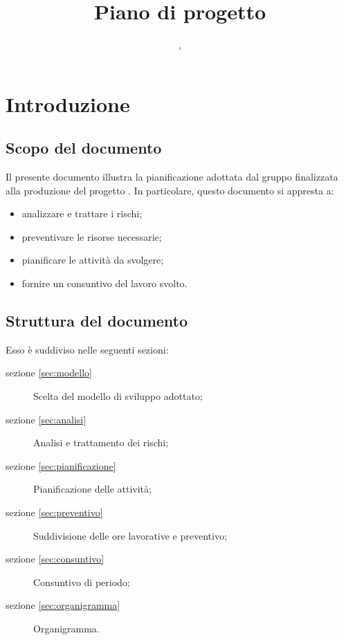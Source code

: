 

\author{\LB, \PB}
\supervisor{\GG, \MM}
\dest{\TV, \ZU}
\title{Piano di progetto}


\maketitle

\tableofcontents
\newpage

\section{Introduzione}
	\subsection{Scopo del documento}

	Il presente documento illustra la pianificazione adottata dal gruppo \hx{} finalizzata alla produzione del progetto \proj{}.
	In particolare, questo documento si appresta a:
	\begin{itemize}
		\item analizzare e trattare i rischi;
		\item preventivare le risorse necessarie;
		\item pianificare le attività da svolgere;
		\item fornire un consuntivo del lavoro svolto.
	\end{itemize}
	\subsection{Struttura del documento}
	Esso è suddiviso nelle seguenti sezioni:
\begin{description}
	\item[sezione \ref{sec:modello}] Scelta del modello di sviluppo adottato;
	\item[sezione \ref{sec:analisi}] Analisi e trattamento dei rischi;
	\item[sezione \ref{sec:pianificazione}] Pianificazione delle attività;
	\item[sezione \ref{sec:preventivo}] Suddivisione delle ore lavorative e preventivo;
           \item[sezione \ref{sec:consuntivo}] Consuntivo di periodo;
	\item[sezione \ref{sec:organigramma}] Organigramma.
\end{description}

